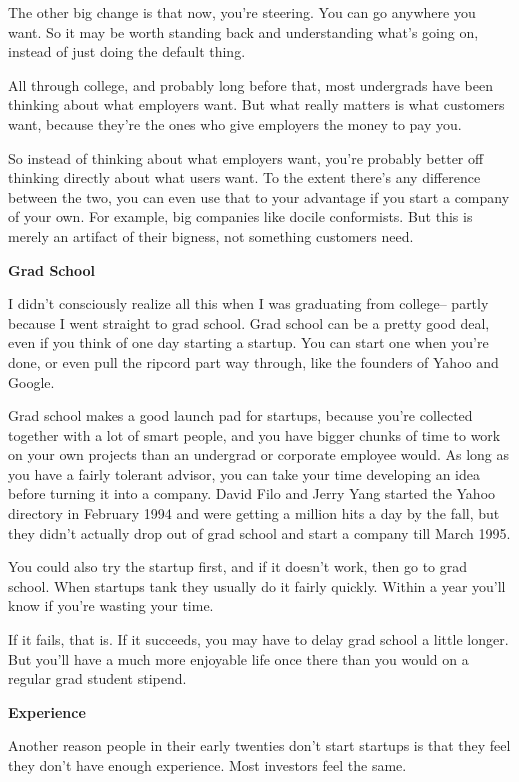 The other big change is that now, you're steering. You can go anywhere
you want. So it may be worth standing back and understanding what's
going on, instead of just doing the default thing.

All through college, and probably long before that, most undergrads have
been thinking about what employers want. But what really matters is what
customers want, because they're the ones who give employers the money to
pay you.

So instead of thinking about what employers want, you're probably better
off thinking directly about what users want. To the extent there's any
difference between the two, you can even use that to your advantage if
you start a company of your own. For example, big companies like docile
conformists. But this is merely an artifact of their bigness, not
something customers need.

\textbf{Grad School}

I didn't consciously realize all this when I was graduating from
college-- partly because I went straight to grad school. Grad school can
be a pretty good deal, even if you think of one day starting a startup.
You can start one when you're done, or even pull the ripcord part way
through, like the founders of Yahoo and Google.

Grad school makes a good launch pad for startups, because you're
collected together with a lot of smart people, and you have bigger
chunks of time to work on your own projects than an undergrad or
corporate employee would. As long as you have a fairly tolerant advisor,
you can take your time developing an idea before turning it into a
company. David Filo and Jerry Yang started the Yahoo directory in
February 1994 and were getting a million hits a day by the fall, but
they didn't actually drop out of grad school and start a company till
March 1995.

You could also try the startup first, and if it doesn't work, then go to
grad school. When startups tank they usually do it fairly quickly.
Within a year you'll know if you're wasting your time.

If it fails, that is. If it succeeds, you may have to delay grad school
a little longer. But you'll have a much more enjoyable life once there
than you would on a regular grad student stipend.

\textbf{Experience}

Another reason people in their early twenties don't start startups is
that they feel they don't have enough experience. Most investors feel
the same.

